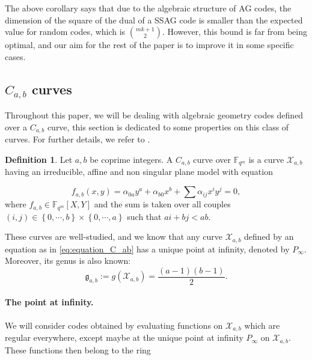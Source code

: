\documentclass[a4paper]{article}
\theoremstyle{definition}
\newtheorem{definition}[thm]{Definition}
\theoremstyle{remark}
\newcommand{\calX}{\mathcal{X}}
\newcommand{\fqm}{\mathbb{F}_{q^m}}
\newcommand{\set}[1]{\left\{#1\right\}}
\begin{document}
The above corollary says that due to the algebraic structure of AG codes, the dimension of the square of the dual of a SSAG code is smaller than the expected value for random codes, which is $\binom{mk+1}{2}$. However, this bound is far from being optimal, and our aim for the rest of the paper is to improve it in some specific cases. 





\subsection{$C_{a,b}$ curves} \label{section:C_a,b_codes}

Throughout this paper, we will be dealing with algebraic geometry codes defined over a $C_{a,b}$ curve, this section is dedicated to some properties on this class of curves. For further details, we refer to \cite{Miu93}. 


\begin{definition} \label{def:C_ab_curves} 
Let $a,b$ be coprime integers. A $C_{a,b}$ curve over $\fqm$ is a curve $\calX_{a,b}$ having an irreducible, affine and non singular plane model with equation

\begin{equation} \label{eq:equation_C_ab}
f_{a,b}(x,y) = \alpha_{0a}y^a + \alpha_{b0}x^b + \sum \alpha_{ij}x^iy^j = 0,
\end{equation}
where $f_{a,b} \in \fqm[X,Y]$ and the sum is taken over all couples $(i,j) \in \set{0,\cdots,b} \times \set{0,\cdots,a}$ such that $ai+bj < ab$.
\end{definition}

\noindent These curves are well-studied, and we know that any curve $\calX_{a,b}$ defined by an equation as in \eqref{eq:equation_C_ab} has a unique point at infinity, denoted by $P_{\infty}$. Moreover, its genus is also known:
\[\mathfrak{g}_{a,b}:=g(\calX_{a,b}) = \dfrac{(a-1)(b-1)}{2}.\]




\paragraph{The point at infinity.} We will consider codes obtained by evaluating functions on $\calX_{a,b}$ which are regular everywhere, except maybe at the unique point at infinity $P_\infty$ on $\calX_{a,b}$. These functions then belong to the ring 
\end{document}
